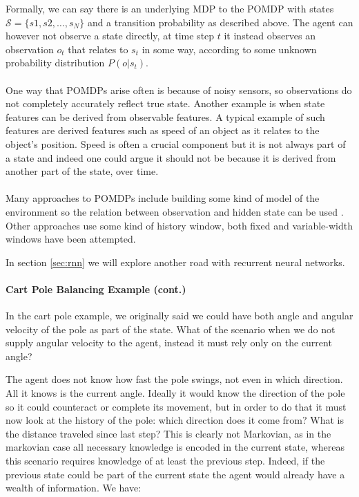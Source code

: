 Formally, we can say there is an underlying MDP to the POMDP
with states $\mathcal{S} = \{s1, s2,\dots,s_N\}$
and a transition probability as described above.
The agent can however not observe a state directly,
at time step $t$ it instead observes an observation $o_t$
that relates to $s_t$ in some way,
according to some unknown probability distribution $P(o|s_t)$.

\paragraph{}
One way that POMDPs arise often is because of noisy sensors,
so observations do not completely accurately reflect true state.
Another example is when state features can be derived
from observable features.
A typical example of such features are derived features
such as speed of an object as it relates to the object's position.
Speed is often a crucial component but it is not always
part of a state and indeed one could argue it should not be
because it is derived from another part of the state, over time.

\paragraph{}
Many approaches to POMDPs
include building some kind of model of the environment
so the relation between observation and hidden state can be used
\parencite{Cassandra1994}.
Other approaches use some kind of history window,
both fixed
\parencite{mccallum1995instance}
and variable-width windows
\parencite{ring1994continual}
have been attempted.

In section \ref{sec:rnn}
we will explore another road
with recurrent neural networks.

\paragraph{Cart Pole Balancing Example (cont.)}
In the cart pole example, we originally said we could have both angle
and angular velocity of the pole as part of the state.
What of the scenario when we do not supply angular velocity to the agent,
instead it must rely only on the current angle?

The agent does not know how fast the pole swings,
not even in which direction.
All it knows is the current angle.
Ideally it would know the direction of the pole
so it could counteract or complete its movement,
but in order to do that it must now look at the history
of the pole: which direction does it come from?
What is the distance traveled since last step?
This is clearly not Markovian,
as in the markovian case all necessary knowledge
is encoded in the current state,
whereas this scenario requires knowledge of at least the previous step.
Indeed, if the previous state could be part of the current state
the agent would already have a wealth of information.
We have:

